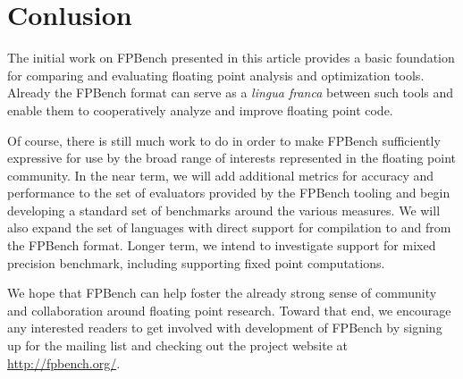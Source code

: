 \documentclass[main.tex]{subfiles}
\begin{document}
\section{Conlusion}
\label{sec:conclusion}

The initial work on FPBench presented in this article provides a basic
foundation for comparing and evaluating floating point analysis and
optimization tools.  Already the FPBench format can serve as a
\textit{lingua franca} between such tools and enable them to
cooperatively analyze and improve floating point code.

Of course, there is still much work to do in order to make FPBench
sufficiently expressive for use by the broad range of interests represented
in the floating point community.  In the near term, we will add additional
metrics for accuracy and performance to the set of evaluators provided by
the FPBench tooling and begin developing a standard set of benchmarks
around the various measures.  We will also expand the set of languages with
direct support for compilation to and from the FPBench format.  Longer
term, we intend to investigate support for mixed precision benchmark,
including supporting fixed point computations.

We hope that FPBench can help foster the already strong sense of community
and collaboration around floating point research.  Toward that end, we
encourage any interested readers to get involved with development of
FPBench by signing up for the mailing list and checking out the project
website at \url{http://fpbench.org/}.
\end{document}
